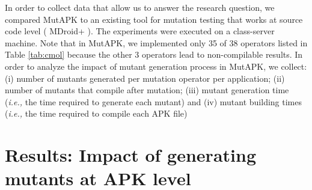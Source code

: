 In order to collect data that allow us to answer the research question, we compared MutAPK to an existing tool for mutation testing that works at source code level ( MDroid+ \cite{linares2017enabling} ). 
The experiments were executed on a class-server machine. 
Note that in MutAPK, we implemented only 35 of 38 operators listed in Table \ref{tab:cmol} because the other 3 operators lead to non-compilable results. In order to analyze the impact of mutant generation process in MutAPK, we collect: (i) number of mutants generated per mutation operator per application; (ii) number of mutants that compile after mutation; (iii) mutant generation time (\textit{i.e.,} the time required to generate each mutant) and (iv) mutant building times (\textit{i.e.,} the time required to compile each APK file)
\begin{table}[t]
	\centering
	\caption{Applications used for the study}
	\label{tab:alufs}
\end{table}

\section{Results: Impact of generating mutants at APK level}

